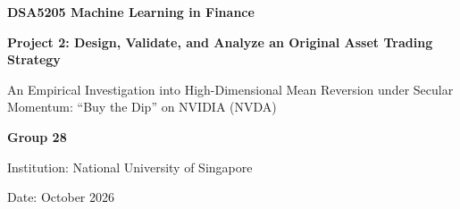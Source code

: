\documentclass[12pt, a4paper]{article}
\begin{document}
\begin{titlepage}
    \centering
    \vspace*{2in}
    {\LARGE\bfseries DSA5205 Machine Learning in Finance\par}
    \vspace{0.8in}
    {\huge\bfseries Project 2: Design, Validate, and Analyze an Original Asset Trading Strategy\par}
    \vspace{0.4in}
    {\Large An Empirical Investigation into High-Dimensional Mean Reversion under Secular Momentum: ``Buy the Dip'' on NVIDIA (NVDA)\par}
    \vspace{1.5in}
    {\Large \textbf{Group 28}\par}
    \vspace{0.3in}
    {\Large Institution: National University of Singapore\par}
    \vspace{0.3in}
    {\Large Date: October 2026\par}
\end{titlepage}

\newpage
\tableofcontents
\newpage
\end{document}
